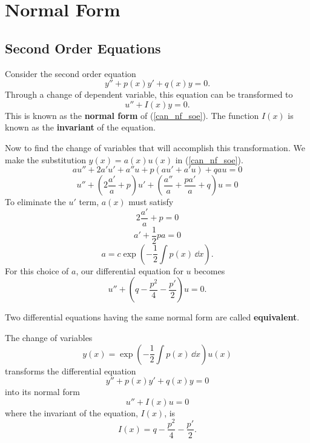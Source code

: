 \section{Normal Form}

\subsection{Second Order Equations}

Consider the second order equation
\begin{equation}
  \label{can_nf_soe}
  y'' + p(x) y' + q(x) y = 0.
\end{equation}
Through a change of dependent variable, this equation can be transformed
to 
\[
u'' + I(x) y = 0.
\]
This is known as the \textbf{normal form} of (\ref{can_nf_soe}).
The function $I(x)$ is known as the \textbf{invariant} of the equation.

Now to find the change of variables that will accomplish this transformation.
We make the substitution $y(x) = a(x) u(x)$ in (\ref{can_nf_soe}).
\[
a u'' + 2 a' u' + a'' u + p (a u' + a' u) + q a u = 0
\]
\[
u'' + \left( 2 \frac{a'}{a} + p \right) u' + \left( \frac{a''}{a} 
  + \frac{p a'}{a} + q \right) u = 0
\]
To eliminate the $u'$ term, $a(x)$ must satisfy
\[
2 \frac{a'}{a} + p = 0
\]
\[
a' + \frac{1}{2} p a = 0
\]
\[
a = c \exp\left( - \frac{1}{2} \int p(x) \,\dd x \right).
\]
For this choice of $a$, our differential equation for $u$ becomes
\[
u'' + \left( q - \frac{p^2}{4} - \frac{p'}{2} \right) u = 0.
\]

Two differential equations having the same normal form are called
\textbf{equivalent}.  

\begin{Result}
  The change of variables
  \[
  y(x) = \exp\left( - \frac{1}{2} \int p(x) \,\dd x \right) u(x)
  \]
  transforms the differential equation
  \[
  y'' + p(x) y' + q(x) y = 0
  \]
  into its normal form
  \[
  u'' + I(x) u = 0
  \]
  where the invariant of the equation, $I(x)$, is
  \[
  I(x) =  q - \frac{p^2}{4} - \frac{p'}{2}.
  \]
\end{Result}
















